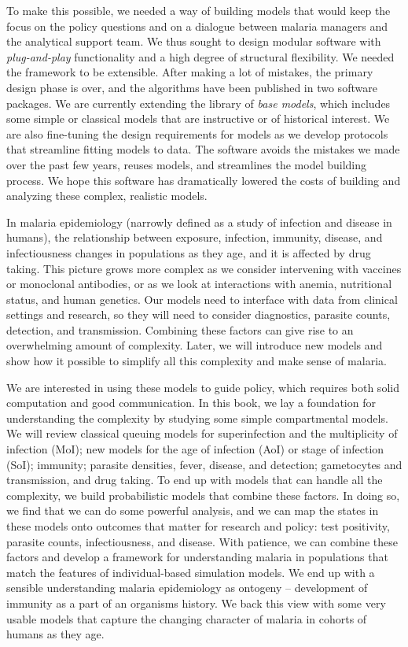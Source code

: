 \documentclass[
]{book}
\begin{document}
To make this possible, we needed a way of building models that would keep the focus on the policy questions and on a dialogue between malaria managers and the analytical support team. We thus sought to design modular software with \emph{plug-and-play} functionality and a high degree of structural flexibility. We needed the framework to be extensible. After making a lot of mistakes, the primary design phase is over, and the algorithms have been published in two software packages. We are currently extending the library of \emph{base models}, which includes some simple or classical models that are instructive or of historical interest. We are also fine-tuning the design requirements for models as we develop protocols that streamline fitting models to data. The software avoids the mistakes we made over the past few years, reuses models, and streamlines the model building process. We hope this software has dramatically lowered the costs of building and analyzing these complex, realistic models.

In malaria epidemiology (narrowly defined as a study of infection and disease in humans), the relationship between exposure, infection, immunity, disease, and infectiousness changes in populations as they age, and it is affected by drug taking. This picture grows more complex as we consider intervening with vaccines or monoclonal antibodies, or as we look at interactions with anemia, nutritional status, and human genetics. Our models need to interface with data from clinical settings and research, so they will need to consider diagnostics, parasite counts, detection, and transmission. Combining these factors can give rise to an overwhelming amount of complexity. Later, we will introduce new models and show how it possible to simplify all this complexity and make sense of malaria.

We are interested in using these models to guide policy, which requires both solid computation and good communication. In this book, we lay a foundation for understanding the complexity by studying some simple compartmental models. We will review classical queuing models for superinfection and the multiplicity of infection (MoI); new models for the age of infection (AoI) or stage of infection (SoI); immunity; parasite densities, fever, disease, and detection; gametocytes and transmission, and drug taking. To end up with models that can handle all the complexity, we build probabilistic models that combine these factors. In doing so, we find that we can do some powerful analysis, and we can map the states in these models onto outcomes that matter for research and policy: test positivity, parasite counts, infectiousness, and disease. With patience, we can combine these factors and develop a framework for understanding malaria in populations that match the features of individual-based simulation models. We end up with a sensible understanding malaria epidemiology as ontogeny -- development of immunity as a part of an organisms history. We back this view with some very usable models that capture the changing character of malaria in cohorts of humans as they age.
\end{document}
